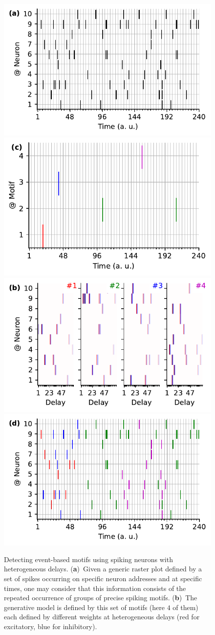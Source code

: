 \documentclass[brainsci, %
               review,accept,pdftex,moreauthors
               ]{Definitions/mdpi}
\begin{document}
\begin{figure}[H]%
    \includegraphics[width=0.490\linewidth]{figures/THC_1a_k.pdf}
    \includegraphics[width=0.480\linewidth]{figures/THC_1c.pdf}
    \includegraphics[width=0.490\linewidth]{figures/THC_1b.pdf}
    \includegraphics[width=0.490\linewidth]{figures/THC_1a.pdf}
      \caption{
        Detecting event-based motifs using spiking neurons with heterogeneous delays.
      { (\textbf{a})}~Given a generic raster plot defined by a set of spikes occurring on specific neuron addresses and at specific times, one may consider that this information consists of the repeated occurrence of groups of precise spiking motifs. 
      { (\textbf{b})}~The generative model is defined by this set of motifs (here $4$ of them) each defined by different weights at heterogeneous delays (red for excitatory, blue for inhibitory). 
}
\end{figure}
\end{document}
